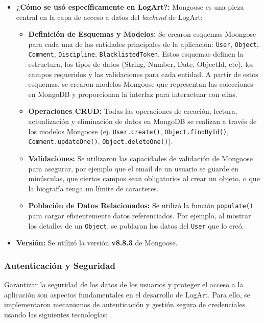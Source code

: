 \begin{itemize}
    \item \textbf{¿Cómo se usó específicamente en LogArt?:} Mongoose es una pieza central en la capa de acceso a datos del \textit{backend} de LogArt:
        \begin{itemize}
            \item \textbf{Definición de Esquemas y Modelos:} Se crearon esquemas Moongose para cada una de las entidades principales de la aplicación: \texttt{User}, \texttt{Object}, \texttt{Comment}, \texttt{Discipline}, \texttt{BlacklistedToken}. Estos esquemas definen la estructura, los tipos de datos (String, Number, Date, ObjectId, etc), los campos requeridos y las validaciones para cada entidad. A partir de estos esquemas, se crearon modelos Mongoose que representan las colecciones en MongoDB y proporcionan la interfaz para interactuar con ellas.
            \item \textbf{Operaciones CRUD:} Todas las operaciones de creación, lectura, actualización y eliminación de datos en MongoDB se realizan a través de los modelos Mongoose (ej. \texttt{User.create()}, \texttt{Object.findById()}, \texttt{Comment.updateOne()}, \texttt{Object.deleteOne()}).
            \item \textbf{Validaciones:} Se utilizaron las capacidades de validación de Mongoose para asegurar, por ejemplo que el email de un usuario se guarde en minúsculas, que ciertos campos sean obligatorios al crear un objeto, o que la biografía tenga un límite de caracteres.
            \item \textbf{Población de Datos Relacionados:} Se utilizó la función \texttt{populate()} para cargar eficientemente datos referenciados. Por ejemplo, al mostrar los detalles de un \texttt{Object}, se poblaron los datos del \texttt{User} que lo creó.
        \end{itemize}
    \item \textbf{Versión:} Se utilizó la versión \textbf{v8.8.3} de Mongoose.
\end{itemize}

\subsubsection{Autenticación y Seguridad}
\label{sec:authSeguridadBackend}

Garantizar la seguridad de los datos de los usuarios y proteger el acceso a la aplicación son aspectos fundamentales en el desarrollo de LogArt. Para ello, se implementaron mecanismos de autenticación y gestión segura de credenciales usando las siguientes tecnologías:

